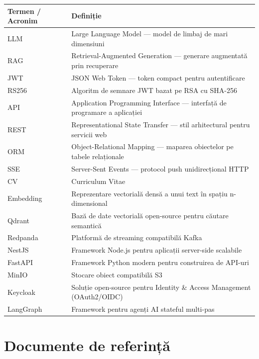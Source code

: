 \documentclass[12pt, a4paper]{report}
\begin{document}
\begin{center}
\begin{tabularx}{\textwidth}{lX}
\toprule
\rowcolor{primary!15}
\textbf{Termen / Acronim} & \textbf{Definiție} \\
\midrule
LLM & Large Language Model — model de limbaj de mari dimensiuni \\
RAG & Retrieval-Augmented Generation — generare augmentată prin recuperare \\
JWT & JSON Web Token — token compact pentru autentificare \\
RS256 & Algoritm de semnare JWT bazat pe RSA cu SHA-256 \\
API & Application Programming Interface — interfață de programare a aplicației \\
REST & Representational State Transfer — stil arhitectural pentru servicii web \\
ORM & Object-Relational Mapping — maparea obiectelor pe tabele relaționale \\
SSE & Server-Sent Events — protocol push unidirecțional HTTP \\
CV & Curriculum Vitae \\
Embedding & Reprezentare vectorială densă a unui text în spațiu n-dimensional \\
Qdrant & Bază de date vectorială open-source pentru căutare semantică \\
Redpanda & Platformă de streaming compatibilă Kafka \\
NestJS & Framework Node.js pentru aplicații server-side scalabile \\
FastAPI & Framework Python modern pentru construirea de API-uri \\
MinIO & Stocare obiect compatibilă S3 \\
Keycloak & Soluție open-source pentru Identity \& Access Management (OAuth2/OIDC) \\
LangGraph & Framework pentru agenți AI stateful multi-pas \\
\bottomrule
\end{tabularx}
\end{center}

\section{Documente de referință}
\end{document}
